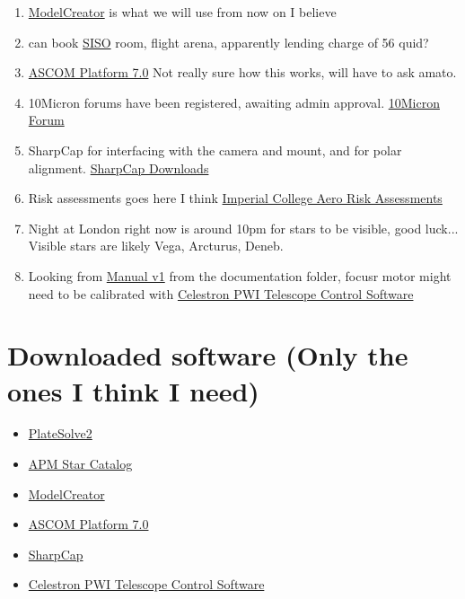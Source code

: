\documentclass[../main.tex]{subfiles}
\begin{document}
\begin{enumerate}
\begin{itemize}
    \end{itemize}
        \item \href{https://10micron.eu/en/downloads/modelcreator}{ModelCreator} is what we will use from now on I believe
        \item can book \href{https://imperial.siso.co/ui/search-basket.php}{SISO} room, flight arena, apparently lending charge of 56 quid?
        \item \href{https://ascom-standards.org/Downloads/Index.htm}{ASCOM Platform 7.0} Not really sure how this works, will have to ask amato.
        \item 10Micron forums have been registered, awaiting admin approval. \href{https://forum.10micron.eu/}{10Micron Forum}
        \item SharpCap for interfacing with the camera and mount, and for polar alignment. \href{https://www.sharpcap.co.uk/sharpcap/downloads}{SharpCap Downloads}
        \item Risk assessments goes here I think \href{https://imperiallondon.sharepoint.com/sites/foe/aero/safety/General%20Risk%20Assessments/Forms/MyItems.aspx}{Imperial College Aero Risk Assessments}
        \item Night at London right now is around 10pm for stars to be visible, good luck... Visible stars are likely Vega, Arcturus, Deneb.
        \item Looking from \href{https://imperiallondon-my.sharepoint.com/:w:/r/personal/damato_ic_ac_uk/Documents/Documents/Project%20management/CICLOPS/Documentation/Manual_v1.docx?d=wb7504c9d211b4b098ad126b4b6c34f2e&csf=1&web=1&e=2N7g7I}{Manual v1} from the documentation folder, focusr motor might need to be calibrated with \href{https://www.celestron.com/pages/celestron-pwi-telescope-control-software}{Celestron PWI Telescope Control Software}
\end{enumerate}
\section{Downloaded software (Only the ones I think I need)}
\begin{itemize}
    \item \href{https://astroguide.starlust.de/html/PlateSolve2.html}{PlateSolve2}
    \item \href{https://astroguide.starlust.de/html/PlateSolve2.html}{APM Star Catalog}
    \item \href{https://10micron.eu/en/downloads/modelcreator}{ModelCreator}
    \item \href{https://ascom-standards.org/Downloads/Index.htm}{ASCOM Platform 7.0}
    \item \href{https://www.sharpcap.co.uk/sharpcap/downloads}{SharpCap}
    \item \href{https://www.celestron.com/pages/celestron-pwi-telescope-control-software}{Celestron PWI Telescope Control Software}
\end{itemize}
\end{document}
